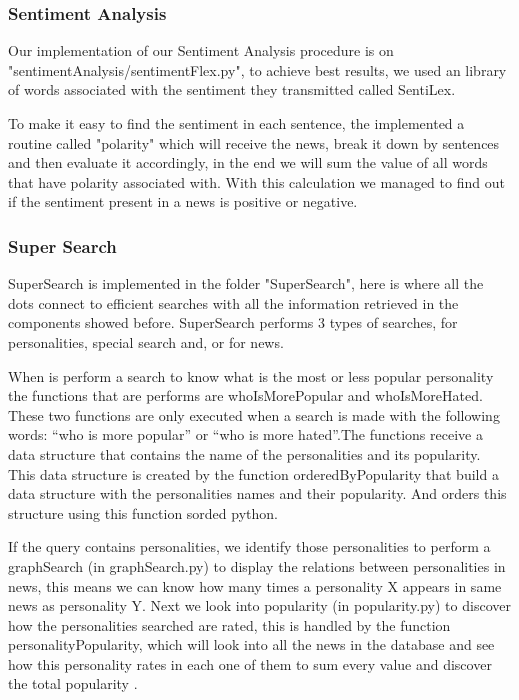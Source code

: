 \documentclass{acm_proc_article-sp}
\begin{document}
\subsubsection{Sentiment Analysis}

Our implementation of our Sentiment Analysis procedure is on "sentimentAnalysis/sentimentFlex.py", to achieve best results, we used an library of words associated with the sentiment they transmitted called SentiLex\cite{sent}. 

To make it easy to find the sentiment in each sentence, the implemented a routine called "polarity" which will receive the news, break it down by sentences and then evaluate it accordingly, in the end we will sum the value of all words that have polarity associated with. With this calculation we managed to find out if the sentiment present in a news is positive or negative.

\subsubsection{Super Search}

SuperSearch is implemented in the folder "SuperSearch", here is where all the dots connect to efficient searches with all the information retrieved in the components showed before.
SuperSearch performs 3 types of searches, for personalities, special search and, or for news.

When is perform a search to know what is the most or less popular personality the functions that are performs are whoIsMorePopular and whoIsMoreHated. These two functions are only executed when a search is made with the following words: “who is more popular” or “who is more hated”.The functions receive a data structure that contains the name of the personalities and its popularity. This data structure is created by the function orderedByPopularity that build a data structure with the personalities names and their popularity. And orders this structure using this function sorded python.

If the query contains personalities, we identify those personalities to perform a graphSearch (in graphSearch.py) to display the relations between personalities in news, this means we can know how many times a personality X appears in same news as personality Y. Next we look into popularity (in popularity.py) to discover how the personalities searched are rated, this is handled by the function personalityPopularity, which will look into all the news in the database and see how this personality rates in each one of them to sum every value and discover the total popularity .
\end{document}

